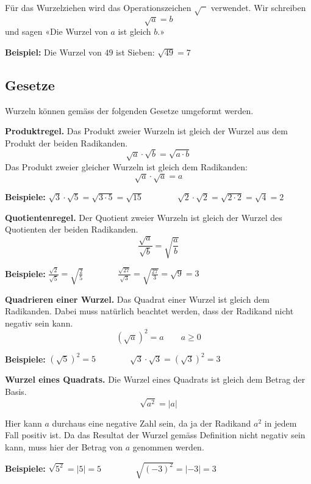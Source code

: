 Für das Wurzelziehen wird das Operationszeichen $\sqrt{\phantom{x}}$ verwendet. Wir schreiben
\[
  \sqrt{a} = b
\]
und sagen «Die Wurzel von $a$ ist gleich $b$.»
\begin{example}
  \textbf{Beispiel:} Die Wurzel von $49$ ist Sieben: $\sqrt{49} = 7$
\end{example}

\subsection{Gesetze}

Wurzeln können gemäss der folgenden Gesetze umgeformt werden.
\begin{theorem}
  \textbf{Produktregel.} Das Produkt zweier Wurzeln ist gleich der Wurzel aus dem Produkt der beiden Radikanden.
  \[
    \sqrt{a}\cdot\sqrt{b} = \sqrt{a\cdot b}
  \]
  Das Produkt zweier gleicher Wurzeln ist gleich dem Radikanden:
  \[
    \sqrt{a}\cdot\sqrt{a} = a
  \]
\end{theorem}
\begin{example}
  \textbf{Beispiele:} $\displaystyle \sqrt{3}\cdot\sqrt{5} = \sqrt{3\cdot 5} = \sqrt{15} \qquad\qquad \sqrt{2}\cdot\sqrt{2} = \sqrt{2\cdot 2} = \sqrt{4} = 2$
\end{example}
\begin{theorem}
  \textbf{Quotientenregel.} Der Quotient zweier Wurzeln ist gleich der Wurzel des Quotienten der beiden Radikanden.
  \[
    \frac{\sqrt{a}}{\sqrt{b}} = \sqrt{\frac{a}{b}}
  \]
\end{theorem}
\begin{example}
  \textbf{Beispiele:} $\displaystyle \frac{\sqrt{2}}{\sqrt{5}} = \sqrt{\frac{2}{5}} \qquad\qquad \frac{\sqrt{27}}{\sqrt{3}} = \sqrt{\frac{27}{3}} = \sqrt{9} = 3$
\end{example}
\begin{theorem}
  \textbf{Quadrieren einer Wurzel.} Das Quadrat einer Wurzel ist gleich dem Radikanden. Dabei muss natürlich beachtet werden, dass der Radikand nicht negativ sein kann.
  \[
    \left(\sqrt{a}\right)^{2} = a \qquad a\ge 0
  \]
\end{theorem}
\begin{example}
  \textbf{Beispiele:} $\displaystyle \left(\sqrt{5}\right)^{2} = 5 \qquad\qquad \sqrt{3}\cdot\sqrt{3} = \left(\sqrt{3}\right)^{2} = 3$
\end{example}
\begin{theorem}
  \textbf{Wurzel eines Quadrats.} Die Wurzel eines Quadrats ist gleich dem Betrag der Basis.
  \[
    \sqrt{a^{2}} = |a|
  \]
\end{theorem}
Hier kann $a$ durchaus eine negative Zahl sein, da ja der Radikand $a^{2}$ in jedem Fall positiv ist. Da das Resultat der Wurzel gemäss Definition nicht negativ sein kann, muss hier der Betrag von $a$ genommen werden.
\begin{example}
  \textbf{Beispiele:} $\displaystyle \sqrt{5^{2}} = |5| = 5 \qquad\qquad \sqrt{(-3)^{2}} = |-3| = 3$
\end{example}
